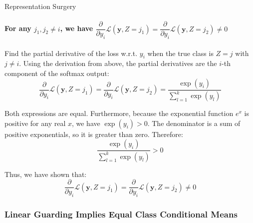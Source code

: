 \begin{question}{Representation Surgery}
\begin{subquestion}
\paragraph{For any $j_1, j_2 \neq i$, we have $\dfrac{\partial}{\partial y_i}\mathcal{L}(\mathbf{y}, Z = j_1) = \dfrac{\partial}{\partial y_i}\mathcal{L}(\mathbf{y}, Z = j_2) \neq 0$}
Find the partial derivative of the loss w.r.t. $y_i$ when the true class is $Z = j$ with $j \neq i$. 
Using the derivation from above, the partial derivatives are the $i$-th component of the softmax output:
\begin{equation}
    \frac{\partial}{\partial y_i}\mathcal{L}(\mathbf{y}, Z = j_1) = \frac{\partial}{\partial y_i}\mathcal{L}(\mathbf{y}, Z = j_2) = \frac{\exp(y_i)}{\sum_{l=1}^k \exp(y_l)}
\end{equation}

Both expressions are equal. 
Furthermore, because the exponential function $e^x$ is positive for any real $x$, we have $\exp(y_i) > 0$. 
The denominator is a sum of positive exponentials, so it is greater than zero. 
Therefore:
\begin{equation}
    \frac{\exp(y_i)}{\sum_{l=1}^k \exp(y_l)} > 0
\end{equation}

Thus, we have shown that:
\begin{equation}
    \frac{\partial}{\partial y_i}\mathcal{L}(\mathbf{y}, Z = j_1) = \frac{\partial}{\partial y_i}\mathcal{L}(\mathbf{y}, Z = j_2) \neq 0
\end{equation}

\end{subquestion}

\begin{subquestion}

\subsubsection*{Linear Guarding Implies Equal Class Conditional Means}


\end{subquestion}
\end{question}
